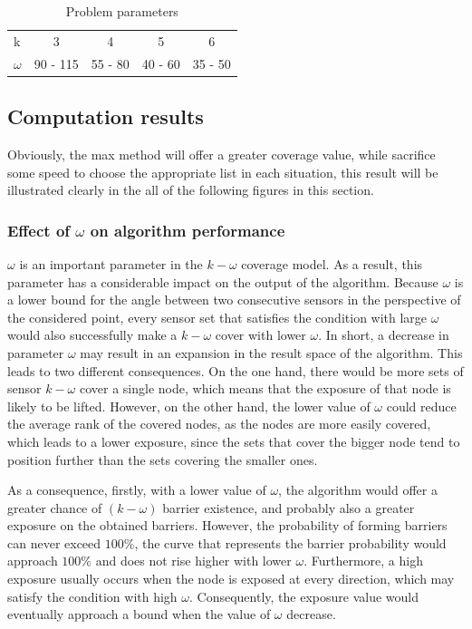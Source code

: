 \begin{table}[h!]
	\centering
	\begin{tabular}{l | c | c | c | c}
		k & 3 & 4 & 5 & 6\\
		$\omega$ & 90 - 115 & 55 - 80 & 40 - 60 & 35 - 50\\
	\end{tabular}
	\caption{Problem parameters}
\end{table}

\subsection{Computation results}

Obviously, the max method will offer a greater coverage value, while sacrifice some speed to choose the appropriate list in each situation, this result will be illustrated clearly in the all of the following figures in this section.

\subsubsection{Effect of $\omega$ on algorithm performance}

$\omega$ is an important parameter in the $k-\omega$ coverage model. As a result, this parameter has a considerable impact on the output of the algorithm. Because $\omega$ is a lower bound for the angle between two consecutive sensors in the perspective of the considered point, every sensor set that satisfies the condition with large $\omega$ would also successfully make a $k-\omega$ cover with lower $\omega$. In short, a decrease in parameter $\omega$ may result in an expansion in the result space of the algorithm. This leads to two different consequences. On the one hand, there would be more sets of sensor $k-\omega$ cover a single node, which means that the exposure of that node is likely to be lifted. However, on the other hand, the lower value of $\omega$ could reduce the average rank of the covered nodes, as the nodes are more easily covered, which leads to a lower exposure, since the sets that cover the bigger node tend to position further than the sets covering the smaller ones.

As a consequence, firstly, with a lower value of $\omega$, the algorithm would offer a greater chance of $(k-\omega)$ barrier existence, and probably also a greater exposure on the obtained barriers. However, the probability of forming barriers can never exceed $100\%$, the curve that represents the barrier probability would approach $100\%$ and does not rise higher with lower $\omega$. Furthermore, a high exposure usually occurs when the node is exposed at every direction, which may satisfy the condition with high $\omega$. Consequently, the exposure value would eventually approach a bound when the value of $\omega$ decrease.

